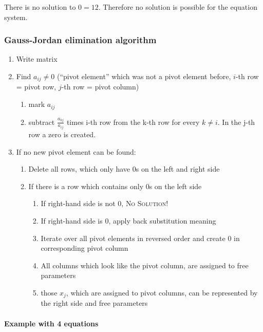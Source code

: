 \documentclass[a4paper,landscape,twocolumn]{article}
\begin{document}
There is no solution to $0 = 12$. Therefore no solution is possible for the equation system.

\subsubsection{Gauss-Jordan elimination algorithm}

\begin{enumerate}
  \item Write matrix
  \item Find $a_{ij} \neq 0$ (\enquote{pivot element} which was not a pivot element before, $i$-th row = pivot row, $j$-th row = pivot column)
    \begin{enumerate}
      \item mark $a_{ij}$
      \item subtract $\frac{a_{kj}}{a_{ij}}$ times i-th row from the k-th row for every $k \neq i$.
        In the j-th row a zero is created.
    \end{enumerate}
  \item If no new pivot element can be found:
    \begin{enumerate}
      \item Delete all rows, which only have 0s on the left and right side
      \item If there is a row which contains only 0s on the left side
        \begin{enumerate}
          \item If right-hand side is not 0, \textsc{No Solution!}
          \item If right-hand side is 0, apply back substitution meaning
          \item Iterate over all pivot elements in reversed order and create 0 in corresponding pivot column
          \item All columns which look like the pivot column, are assigned to free parameters
          \item those $x_j$, which are assigned to pivot columns, can be represented by the right side and free parameters
        \end{enumerate}
    \end{enumerate}
\end{enumerate}

\paragraph{Example with 4 equations}
\label{sec:1-4-6}
\end{document}
